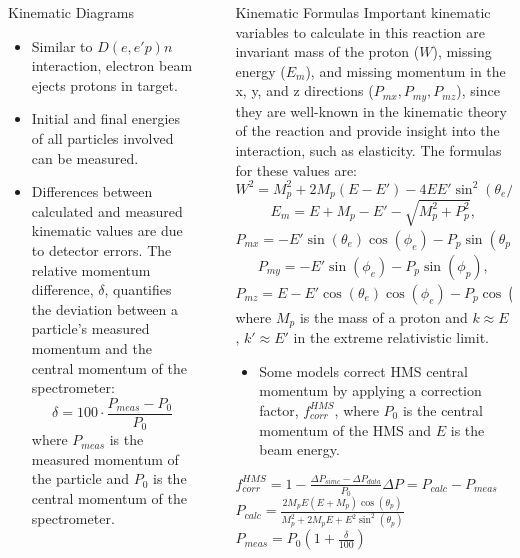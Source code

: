 \documentclass[final]{beamer}
\newlength{\sepwidth}
\newlength{\colwidth}
\newcommand{\separatorcolumn}{\begin{column}{\sepwidth}\end{column}}
\begin{document}
\begin{frame}[t]
\begin{columns}[t]
\begin{column}{\colwidth}
\begin{block}{Kinematic Diagrams}
\begin{itemize}
    \item Similar to $D(e,e'p)n$ interaction, electron beam ejects protons in target.
    \item Initial and final energies of all particles involved can be measured.
    \item Differences between calculated and measured kinematic values are due to detector errors.
\vspace{.5cm}
The relative momentum difference, $\delta$, quantifies the deviation between a particle's measured momentum and the central momentum of the spectrometer: $$\delta=100\cdot \frac{P_{meas}-P_0}{P_0}$$
where $P_{meas}$ is the measured momentum of the particle and $P_0$ is the central momentum of the spectrometer.

\end{itemize}
\end{block}

\end{column}

\separatorcolumn

\begin{column}{\colwidth}
\vspace{-0.5cm}
\begin{block}{Kinematic Formulas}
Important kinematic variables to calculate in this reaction are invariant mass of the proton ($W$), missing energy ($E_m$), and missing momentum in the x, y, and z directions ($P_{mx},P_{my},P_{mz}$), since they are well-known in the kinematic theory of the reaction and provide insight into the interaction, such as elasticity. The formulas for these values are:
    $$W^2=M_p^2+2M_p(E-E')-4EE'\sin^2(\theta_e/2),$$
    $$E_m=E+M_p-E'-\sqrt{M_p^2+P_p^2},$$
    $$P_{mx}=-E'\sin(\theta_e)\cos(\phi_e)-P_p\sin(\theta_p)\cos(\phi_p),$$
    $$P_{my}=-E'\sin(\phi_e)-P_p\sin(\phi_p),$$
    $$P_{mz}=E-E'\cos(\theta_e)\cos(\phi_e)-P_p\cos(\theta_p)\cos(\phi_p),$$
    where $M_p$ is the mass of a proton and $k\approx E$, $k'\approx E'$ in the extreme relativistic limit.
\vspace{-.25cm}
\vspace{-.5cm}
    \begin{itemize}
        \item Some models correct HMS central momentum by applying a correction factor, $f_{corr}^{HMS}$, where $P_0$ is the central momentum of the HMS and $E$ is the beam energy.
    \end{itemize}
    \centering
    $f_{corr}^{HMS}=1-\frac{\Delta P_{simc}-\Delta P_{data}}{P_0}$\hspace{3cm}$\Delta P=P_{calc}-P_{meas}$ \\ \vspace{.25cm}
    $P_{calc}=\frac{2M_pE(E+M_p)\cos(\theta_p)}{M_p^2+2M_pE+E^2\sin^2(\theta_p)}$\hspace{3cm}$P_{meas}=P_0(1+\frac{\delta}{100})$


\end{block}
\end{column}
\end{columns}
\end{frame}
\end{document}
